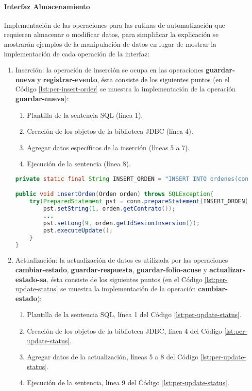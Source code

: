 \paragraph{\indent Interfaz Almacenamiento\\}
Implementación de las operaciones para las rutinas de automatización que requieren almacenar o modificar datos, para simplificar la explicación se mostrarán ejemplos de la manipulación de datos en lugar de mostrar la implementación de cada operación de la interfaz:
\begin{enumerate}
	\item Inserción: la operación de inserción se ocupa en las operaciones \textbf{guardar-nueva} y \textbf{registrar-evento}, ésta consiste de los siguientes puntos (en el Código \ref{lst:per-insert-order} se muestra la implementación de la operación \textbf{guardar-nueva}):
	\begin{enumerate}
		\item Plantilla de la sentencia SQL (línea 1).
		\item Creación de los objetos de la biblioteca JDBC (línea 4).
		\item Agregar datos específicos de la inserción (líneas 5 a 7).
		\item Ejecución de la sentencia (línea 8).
	\end{enumerate}

	\begin{lstlisting}[language=Java, caption={Inserción de una nueva orden de reposición en la base de datos.}, captionpos=b, label={lst:per-insert-order}]
private static final String INSERT_ORDEN = "INSERT INTO ordenes(contrato, solicitud, orden, fecha_expedicion, almacen_destino, url_con, url_env, estatus, id_sesion_insersion, id_sesion_estatus, fecha_estatus) VALUES(?, ?, ?, ?, ?, ?, ?, 1, ?, ?, CURRENT_TIMESTAMP)";

public void insertOrden(Orden orden) throws SQLException{
    try(PreparedStatement pst = conn.prepareStatement(INSERT_ORDEN)){
	    pst.setString(1, orden.getContrato());
	    ...
	    pst.setLong(9, orden.getIdSesionInsersion());
	    pst.executeUpdate();
	}
}
	\end{lstlisting}

	\item Actualización: la actualización de datos es utilizada por las operaciones \textbf{cambiar-estado}, \textbf{guardar-respuesta}, \textbf{guardar-folio-acuse} y \textbf{actualizar-estado-sa}, ésta consiste de los siguientes puntos (en el Código \ref{lst:per-update-status} se muestra la implementación de la operación \textbf{cambiar-estado}):
	\begin{enumerate}
		\item Plantilla de la sentencia SQL, línea 1 del Código \ref{lst:per-update-status}.
		\item Creación de los objetos de la biblioteca JDBC, línea 4 del Código \ref{lst:per-update-status}.
		\item Agregar datos de la actualización, líneas 5 a 8 del Código \ref{lst:per-update-status}.
		\item Ejecución de la sentencia, línea 9 del Código \ref{lst:per-update-status}.
	\end{enumerate}


\end{enumerate}

